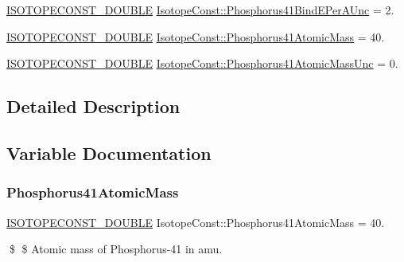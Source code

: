 \begin{DoxyCompactItemize}
\mbox{\hyperlink{group___isotope_const-_macros_ga8f45a7272ce02c0b4c65c44636ed719a}{I\+S\+O\+T\+O\+P\+E\+C\+O\+N\+S\+T\+\_\+\+D\+O\+U\+B\+LE}} \mbox{\hyperlink{group___isotope_const-_phosphorus-_p41_ga867dac3076f9bc7f7ff097570641aaac}{Isotope\+Const\+::\+Phosphorus41\+Bind\+E\+Per\+A\+Unc}} = 2.
\item 
\mbox{\hyperlink{group___isotope_const-_macros_ga8f45a7272ce02c0b4c65c44636ed719a}{I\+S\+O\+T\+O\+P\+E\+C\+O\+N\+S\+T\+\_\+\+D\+O\+U\+B\+LE}} \mbox{\hyperlink{group___isotope_const-_phosphorus-_p41_gabd9c10b0b3271481ab24cb7461ef9942}{Isotope\+Const\+::\+Phosphorus41\+Atomic\+Mass}} = 40.
\item 
\mbox{\hyperlink{group___isotope_const-_macros_ga8f45a7272ce02c0b4c65c44636ed719a}{I\+S\+O\+T\+O\+P\+E\+C\+O\+N\+S\+T\+\_\+\+D\+O\+U\+B\+LE}} \mbox{\hyperlink{group___isotope_const-_phosphorus-_p41_ga7378549c93897fedbcb2751f7c23573d}{Isotope\+Const\+::\+Phosphorus41\+Atomic\+Mass\+Unc}} = 0.
\end{DoxyCompactItemize}


\subsection{Detailed Description}


\subsection{Variable Documentation}
\mbox{\label{group___isotope_const-_phosphorus-_p41_gabd9c10b0b3271481ab24cb7461ef9942}} 
\subsubsection{\texorpdfstring{Phosphorus41\+Atomic\+Mass}{Phosphorus41AtomicMass}}
{\footnotesize\ttfamily \mbox{\hyperlink{group___isotope_const-_macros_ga8f45a7272ce02c0b4c65c44636ed719a}{I\+S\+O\+T\+O\+P\+E\+C\+O\+N\+S\+T\+\_\+\+D\+O\+U\+B\+LE}} Isotope\+Const\+::\+Phosphorus41\+Atomic\+Mass = 40.}

\$ \$ Atomic mass of Phosphorus-\/41 in amu. \mbox{\label{group___isotope_const-_phosphorus-_p41_ga7378549c93897fedbcb2751f7c23573d}} 
